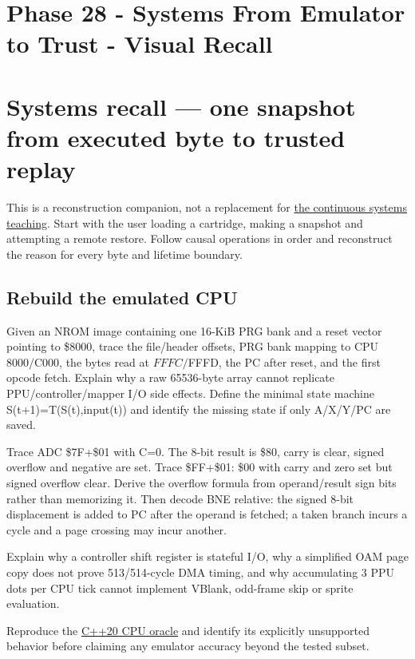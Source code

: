 \hypertarget{appendix-11f73b337e37}{}
\section*{Phase 28 - Systems From Emulator to Trust - Visual Recall}
\section{Systems recall --- one snapshot from executed byte to trusted replay}\label{systems-recall-one-snapshot-from-executed-byte-to-trusted-replay}

This is a reconstruction companion, not a replacement for \href{Continuous\%20Notes/Computing\%20Foundations\%20-\%20From\%20Bits\%20to\%20C++\%20and\%20Systems\%20APIs}{the continuous systems teaching}. Start with the user loading a cartridge, making a snapshot and attempting a remote restore. Follow causal operations in order and reconstruct the reason for every byte and lifetime boundary.

\subsection{Rebuild the emulated CPU}\label{rebuild-the-emulated-cpu}

Given an NROM image containing one 16-KiB PRG bank and a reset vector pointing to \$8000, trace the file/header offsets, PRG bank mapping to CPU \(8000/\)C000, the bytes read at \(FFFC/\)FFFD, the PC after reset, and the first opcode fetch. Explain why a raw 65536-byte array cannot replicate PPU/controller/mapper I/O side effects. Define the minimal state machine S(t+1)=T(S(t),input(t)) and identify the missing state if only A/X/Y/PC are saved.

Trace ADC \$7F+\$01 with C=0. The 8-bit result is \$80, carry is clear, signed overflow and negative are set. Trace \$FF+\$01: \$00 with carry and zero set but signed overflow clear. Derive the overflow formula from operand/result sign bits rather than memorizing it. Then decode BNE relative: the signed 8-bit displacement is added to PC after the operand is fetched; a taken branch incurs a cycle and a page crossing may incur another.

Explain why a controller shift register is stateful I/O, why a simplified OAM page copy does not prove 513/514-cycle DMA timing, and why accumulating 3 PPU dots per CPU tick cannot implement VBlank, odd-frame skip or sprite evaluation.

Reproduce the \href{tools/labs/phase28_emulator_core_lab.cpp}{C++20 CPU oracle} and identify its explicitly unsupported behavior before claiming any emulator accuracy beyond the tested subset.

